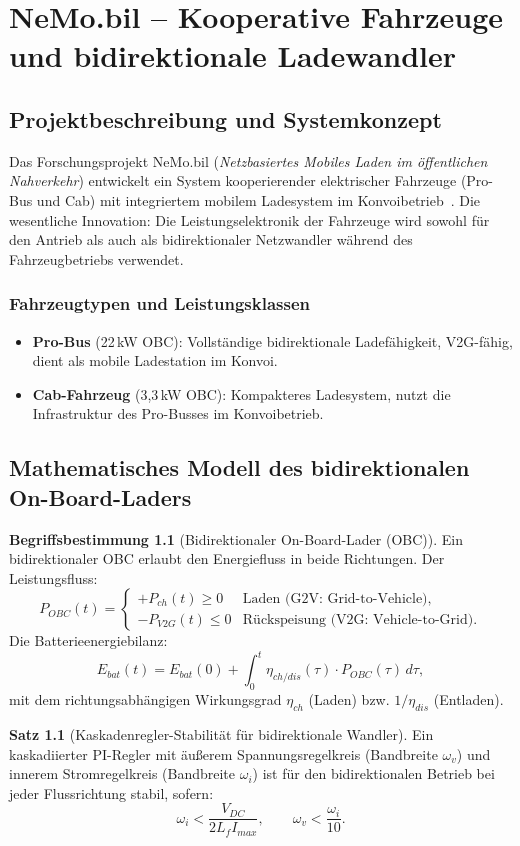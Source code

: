 ﻿\documentclass[a4paper,12pt,openany,oneside]{book}
\newcommand{\abschnitt}[1]{\section{#1}}
\newcommand{\unterabschnitt}[1]{\subsection{#1}}
\theoremstyle{definition}
\newtheorem{definition}{Begriffsbestimmung}[chapter]
\newtheorem{satz}{Satz}[chapter]
\begin{document}
\chapter{NeMo.bil -- Kooperative Fahrzeuge und bidirektionale Ladewandler}
\label{kap:nemo}

\abschnitt{Projektbeschreibung und Systemkonzept}

Das Forschungsprojekt NeMo.bil (\emph{Netzbasiertes Mobiles Laden im \"offentlichen Nahverkehr})
entwickelt ein System kooperierender elektrischer Fahrzeuge (Pro-Bus und Cab) mit
integriertem mobilem Ladesystem im Konvoi\-betrieb~\cite{NemoBil2024}. Die wesentliche
Innovation: Die Leistungselektronik der Fahrzeuge wird sowohl f\"ur den Antrieb als auch
als bidirektionaler Netzwandler w\"ahrend des Fahrzeugbetriebs verwendet.

\unterabschnitt{Fahrzeugtypen und Leistungsklassen}

\begin{itemize}
  \item \textbf{Pro-Bus} (22\,kW OBC): Vollst\"andige bidirektionale Ladef\"ahigkeit,
    V2G-f\"ahig, dient als mobile Ladestation im Konvoi.
  \item \textbf{Cab-Fahrzeug} (3{,}3\,kW OBC): Kompakteres Ladesystem, nutzt
    die Infrastruktur des Pro-Busses im Konvoibetrieb.
\end{itemize}

\abschnitt{Mathematisches Modell des bidirektionalen On-Board-Laders}

\begin{definition}[Bidirektionaler On-Board-Lader (OBC)]
  Ein bidirektionaler OBC erlaubt den Energiefluss in beide Richtungen. Der Leistungsfluss:
  \[
    P_{OBC}(t) = \begin{cases}
      +P_{ch}(t) \geq 0 & \text{Laden (G2V: Grid-to-Vehicle)}, \\
      -P_{V2G}(t) \leq 0 & \text{R\"uckspeisung (V2G: Vehicle-to-Grid)}.
    \end{cases}
  \]
  Die Batterieenergiebilanz:
  \[
    E_{bat}(t) = E_{bat}(0) + \int_0^t \eta_{ch/dis}(\tau) \cdot P_{OBC}(\tau)\,d\tau,
  \]
  mit dem richtungsabh\"angigen Wirkungsgrad $\eta_{ch}$ (Laden) bzw. $1/\eta_{dis}$ (Entladen).
\end{definition}

\begin{satz}[Kaskadenregler-Stabilit\"at f\"ur bidirektionale Wandler]
  Ein kaskadiierter PI-Regler mit \"au\ss{}erem Spannungsregelkreis (Bandbreite $\omega_v$)
  und innerem Stromregelkreis (Bandbreite $\omega_i$) ist f\"ur den bidirektionalen
  Betrieb bei jeder Flussrichtung stabil, sofern:
  \[
    \omega_i < \frac{V_{DC}}{2 L_f I_{max}}, \qquad \omega_v < \frac{\omega_i}{10}.
  \]
\end{satz}
\end{document}
